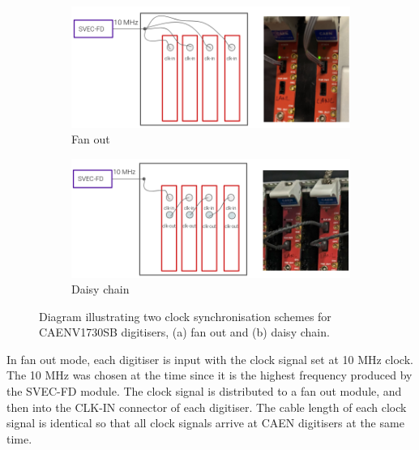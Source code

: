 \begin{figure}[b!]
\begin{subfigure}[h]{0.495\linewidth}
\centering    
\includegraphics[width=\linewidth]{fanout}
\caption{Fan out}
\label{fig:clockScheme_fanout}
\end{subfigure}%
\hfill
\begin{subfigure}[h]{0.495\linewidth}
\centering    
\includegraphics[width=\linewidth]{daisychain}
\caption{Daisy chain}
\label{fig:clockScheme_daisy}
\end{subfigure}
\caption[Clock Synchronisation Schemes]{
Diagram illustrating two clock synchronisation schemes for CAENV1730SB digitisers, (a) fan out and (b) daisy chain.
}
\label{fig:clockScheme}
\end{figure}

In fan out mode, each digitiser is input with the clock signal set at 10 MHz clock.
The 10 MHz was chosen at the time since it is the highest frequency produced by the SVEC-FD module.
The clock signal is distributed to a fan out module, and then into the CLK-IN connector of each digitiser.
The cable length of each clock signal is identical so that all clock signals arrive at CAEN digitisers at the same time.


